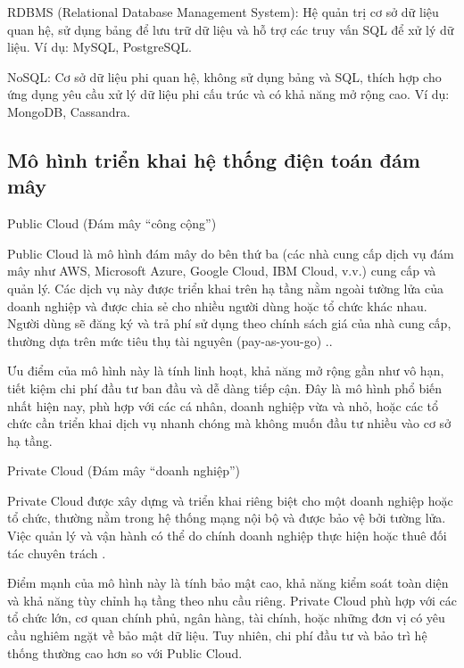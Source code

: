 \begin{myitem}
  \item RDBMS (Relational Database Management System): Hệ quản trị cơ sở dữ liệu quan hệ, sử dụng bảng để lưu trữ dữ liệu và hỗ trợ các truy vấn SQL để xử lý dữ liệu.  
  Ví dụ: MySQL, PostgreSQL.

  \item NoSQL: Cơ sở dữ liệu phi quan hệ, không sử dụng bảng và SQL, thích hợp cho ứng dụng yêu cầu xử lý dữ liệu phi cấu trúc và có khả năng mở rộng cao.  
  Ví dụ: MongoDB, Cassandra.
\end{myitem}

\subsection{Mô hình triển khai hệ thống điện toán đám mây}
\begin{myitem}
  \item Public Cloud (Đám mây “công cộng”)  

  \hspace*{1cm}Public Cloud là mô hình đám mây do bên thứ ba (các nhà cung cấp dịch vụ đám mây như AWS, Microsoft Azure, Google Cloud, IBM Cloud, v.v.) cung cấp và quản lý. Các dịch vụ này được triển khai trên hạ tầng nằm ngoài tường lửa của doanh nghiệp và được chia sẻ cho nhiều người dùng hoặc tổ chức khác nhau. Người dùng sẽ đăng ký và trả phí sử dụng theo chính sách giá của nhà cung cấp, thường dựa trên mức tiêu thụ tài nguyên (pay-as-you-go) \cite{aws_public_vs_private_cloud}..  

  \hspace*{1cm}Ưu điểm của mô hình này là tính linh hoạt, khả năng mở rộng gần như vô hạn, tiết kiệm chi phí đầu tư ban đầu và dễ dàng tiếp cận. Đây là mô hình phổ biến nhất hiện nay, phù hợp với các cá nhân, doanh nghiệp vừa và nhỏ, hoặc các tổ chức cần triển khai dịch vụ nhanh chóng mà không muốn đầu tư nhiều vào cơ sở hạ tầng.  

  \item Private Cloud (Đám mây “doanh nghiệp”) 

  \hspace*{1cm}Private Cloud được xây dựng và triển khai riêng biệt cho một doanh nghiệp hoặc tổ chức, thường nằm trong hệ thống mạng nội bộ và được bảo vệ bởi tường lửa. Việc quản lý và vận hành có thể do chính doanh nghiệp thực hiện hoặc thuê đối tác chuyên trách \cite{aws_public_vs_private_cloud}.  

  \hspace*{1cm}Điểm mạnh của mô hình này là tính bảo mật cao, khả năng kiểm soát toàn diện và khả năng tùy chỉnh hạ tầng theo nhu cầu riêng. Private Cloud phù hợp với các tổ chức lớn, cơ quan chính phủ, ngân hàng, tài chính, hoặc những đơn vị có yêu cầu nghiêm ngặt về bảo mật dữ liệu. Tuy nhiên, chi phí đầu tư và bảo trì hệ thống thường cao hơn so với Public Cloud.  


\end{myitem}
